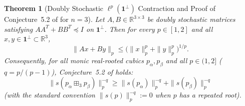 \documentclass[11pt,a4paper]{article}
\newtheorem{theorem}{Theorem}[section]
\theoremstyle{definition}
\newcommand{\R}{\mathbb{R}}
\newcommand{\one}{\mathbf{1}}
\begin{document}
\begin{theorem}[Doubly Stochastic $\ell^p(\one^\perp)$ Contraction and Proof of Conjecture~5.2 of \cite{Hashemi2026} for $n=3$]
\label{thm:p-stam-n3}
Let $A, B \in \R^{3\times 3}$ be doubly stochastic matrices satisfying $AA^T + BB^T \preceq I$ on $\one^\perp$. Then for every $p \in [1, 2]$ and all $x, y \in \one^\perp \subset \R^3$,
\begin{equation}
\label{eq:lp-contraction}
\|A x + B y\|_p \le \big(\|x\|_p^p + \|y\|_p^p\big)^{1/p}.
\end{equation}
Consequently, for all monic real-rooted cubics $p_\alpha, p_\beta$ and all $p \in (1, 2]$ ($q = p/(p-1)$), Conjecture~5.2 of \cite{Hashemi2026} holds:
\[
\|s(p_\alpha \boxplus_3 p_\beta)\|_p^{-q} \ge \|s(p_\alpha)\|_p^{-q} + \|s(p_\beta)\|_p^{-q}
\]
(with the standard convention $\|s(p)\|_p^{-q} := 0$ when $p$ has a repeated root).
\end{theorem}
\end{document}
